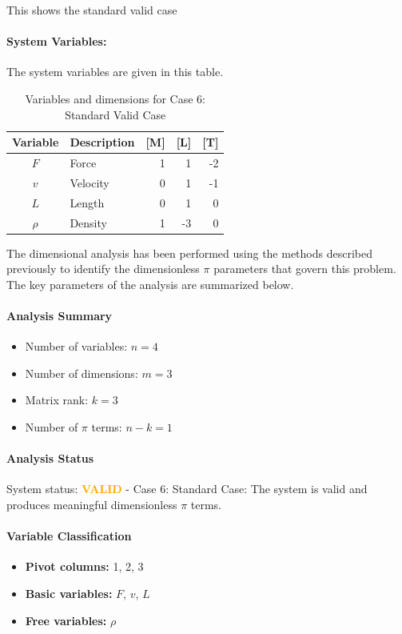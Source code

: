 This shows the standard valid case

\paragraph{System Variables: } The system variables are given in this table.

\begin{table}[H]
\centering
\begin{tabular}{|c|l|r|r|r|}
\hline
\textbf{Variable} & \textbf{Description} & \textbf{[M]} & \textbf{[L]} & \textbf{[T]} \\
\hline
$F$ & Force & 1 & 1 & -2 \\
$v$ & Velocity & 0 & 1 & -1 \\
$L$ & Length & 0 & 1 & 0 \\
$\rho$ & Density & 1 & -3 & 0 \\

\hline
\end{tabular}
\caption{Variables and dimensions for Case 6: Standard Valid Case}
\end{table}

The dimensional analysis has been performed using the methods described previously to identify the dimensionless $\pi$ parameters that govern this problem. The key parameters of the analysis are summarized below.

\paragraph{Analysis Summary}
\begin{itemize}
\item Number of variables: $n = 4$
\item Number of dimensions: $m = 3$
\item Matrix rank: $k = 3$
\item Number of $\pi$ terms: $n - k = 1$
\end{itemize}

\paragraph{Analysis Status}
System status: \textcolor{orange}{\textbf{VALID}} - Case 6: Standard Case: The system is valid and produces meaningful dimensionless $\pi$ terms.


\paragraph{Variable Classification}
\begin{itemize}
\item \textbf{Pivot columns:} 1, 2, 3
\item \textbf{Basic variables:} $F$, $v$, $L$
\item \textbf{Free variables:} $\rho$
\end{itemize}

